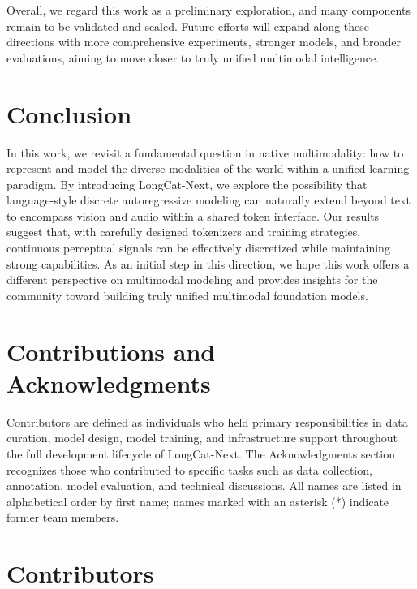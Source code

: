 \documentclass{article}
\begin{document}
Overall, we regard this work as a preliminary exploration, and many components remain to be validated and scaled. Future efforts will expand along these directions with more comprehensive experiments, stronger models, and broader evaluations, aiming to move closer to truly unified multimodal intelligence.




\section{Conclusion}

In this work, we revisit a fundamental question in native multimodality: how to represent and model the diverse modalities of the world within a unified learning paradigm. By introducing LongCat-Next, we explore the possibility that language-style discrete autoregressive modeling can naturally extend beyond text to encompass vision and audio within a shared token interface. Our results suggest that, with carefully designed tokenizers and training strategies, continuous perceptual signals can be effectively discretized while maintaining strong capabilities. As an initial step in this direction, we hope this work offers a different perspective on multimodal modeling and provides insights for the community toward building truly unified multimodal foundation models.

\section{Contributions and Acknowledgments}

Contributors are defined as individuals who held primary responsibilities in data curation, model design, model training, and infrastructure support throughout the full development lifecycle of LongCat-Next. The Acknowledgments section recognizes those who contributed to specific tasks such as data collection, annotation, model evaluation, and technical discussions. All names are listed in alphabetical order by first name; names marked with an asterisk (*) indicate former team members.

\section*{Contributors}
\end{document}
